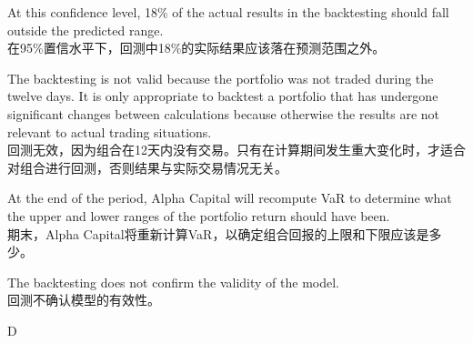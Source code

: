 \documentclass{article}
\begin{document}
\begin{choices}
    \item At this confidence level, 18\% of the actual results in the backtesting should fall outside the predicted range.\\
        在95\%置信水平下，回测中18\%的实际结果应该落在预测范围之外。
    \item The backtesting is not valid because the portfolio was not traded during the twelve days. It is only appropriate to backtest a portfolio that has undergone significant changes between calculations because otherwise the results are not relevant to actual trading situations.\\
        回测无效，因为组合在12天内没有交易。只有在计算期间发生重大变化时，才适合对组合进行回测，否则结果与实际交易情况无关。
    \item At the end of the period, Alpha Capital will recompute VaR to determine what the upper and lower ranges of the portfolio return should have been.\\
        期末，Alpha Capital将重新计算VaR，以确定组合回报的上限和下限应该是多少。
\item The backtesting does not confirm the validity of the model.\\
        回测不确认模型的有效性。
\end{choices}

\begin{correctanswer}
    D
\end{correctanswer}
\end{document}
